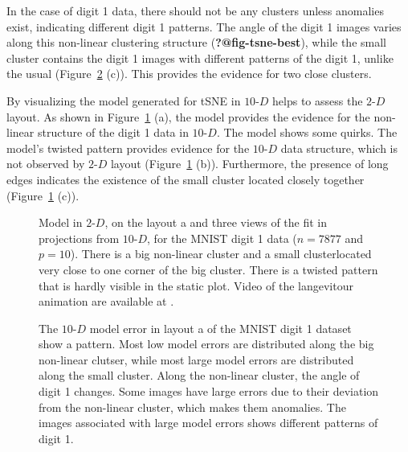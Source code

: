 \documentclass[
  12pt]{article}
\newcommand\gD{$2\text{-}D$}
\begin{document}
In the case of digit 1 data, there should not be any clusters unless
anomalies exist, indicating different digit 1 patterns. The angle of the
digit 1 images varies along this non-linear clustering structure
(\textbf{?@fig-tsne-best}), while the small cluster contains the digit 1
images with different patterns of the digit 1, unlike the usual
(Figure~\ref{fig-model-error-mnist} (c)). This provides the evidence for
two close clusters.

By visualizing the model generated for tSNE in \(10\text{-}D\) helps to
assess the \gD{} layout. As shown in Figure~\ref{fig-mnist-tri-proj}
(a), the model provides the evidence for the non-linear structure of the
digit 1 data in \(10\text{-}D\). The model shows some quirks. The
model's twisted pattern provides evidence for the \(10\text{-}D\) data
structure, which is not observed by \gD{} layout
(Figure~\ref{fig-mnist-tri-proj} (b)). Furthermore, the presence of long
edges indicates the existence of the small cluster located closely
together (Figure~\ref{fig-mnist-tri-proj} (c)).

\begin{figure}[H]


\caption{\label{fig-mnist-tri-proj}Model in \gD{}, on the layout a and
three views of the fit in projections from \(10\text{-}D\), for the
MNIST digit 1 data (\(n =  7877\) and \(p = 10\)). There is a big
non-linear cluster and a small clusterlocated very close to one corner
of the big cluster. There is a twisted pattern that is hardly visible in
the static plot. Video of the langevitour animation are available at .}

\end{figure}%

\begin{figure}[H]


\caption{\label{fig-model-error-mnist}The \(10\text{-}D\) model error in
layout a of the MNIST digit 1 dataset show a pattern. Most low model
errors are distributed along the big non-linear clutser, while most
large model errors are distributed along the small cluster. Along the
non-linear cluster, the angle of digit 1 changes. Some images have large
errors due to their deviation from the non-linear cluster, which makes
them anomalies. The images associated with large model errors shows
different patterns of digit 1.}

\end{figure}%
\end{document}
